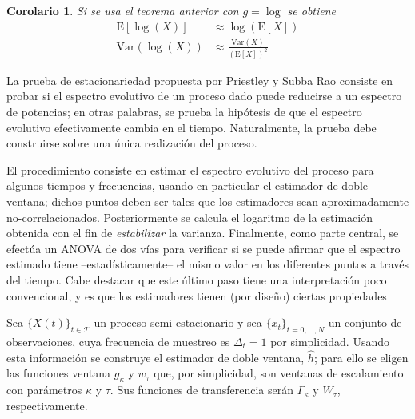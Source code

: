 \documentclass[12pt,letterpaper,draft]{book}
\newtheorem{corolario}[teorema]{Corolario}
\newcommand{\E}[1]{\mathrm{E}\left[ #1 \right]}
\newcommand{\Var}[1]{\mathrm{Var}\left( #1 \right)}
\newcommand{\xt}{$\{X(t)\}_{t\in \mathcal{T}}$ }
\newcommand{\xtd}{$\{x_t\}_{t=0,\dots,N}$ }
\begin{document}
\begin{corolario}
Si se usa el teorema anterior con $g = \log$ se obtiene
\begin{align}
\E{\log(X)} &\approx \log\left( \E{X} \right) \\
\Var{\log(X)} &\approx \frac{\Var{X}}{\left( \E{X} \right)^{2}}
\end{align}
\end{corolario}

La prueba de estacionariedad propuesta por Priestley y Subba Rao \cite{Priestley69} consiste en probar si el espectro evolutivo de un proceso dado puede reducirse a un espectro de potencias; en otras palabras, se prueba la hipótesis de que el espectro evolutivo efectivamente cambia en el tiempo. 
%
Naturalmente, la prueba debe construirse sobre una única realización del proceso.

El procedimiento consiste en estimar el espectro evolutivo del proceso para algunos tiempos y frecuencias, usando en particular el estimador de doble ventana; dichos puntos deben ser tales que los estimadores sean aproximadamente no-correlacionados.
%
Posteriormente se calcula el logaritmo de la estimación obtenida con el fin de \textit{estabilizar} la varianza.
%
Finalmente, como parte central, se efectúa un ANOVA de dos vías para verificar si se puede afirmar que el espectro estimado tiene --estadísticamente-- el mismo valor en los diferentes puntos a través del tiempo.
%
Cabe destacar que este último paso tiene una interpretación poco convencional, y es que los estimadores tienen (por diseño) ciertas propiedades

Sea \xt un proceso semi-estacionario y sea \xtd un conjunto de observaciones, cuya frecuencia de 
muestreo es $\Delta_t=1$ por simplicidad.
%
Usando esta información se construye el estimador de doble ventana, $\widehat{h}$; para ello se eligen las funciones ventana $g_\kappa$ y $w_\tau$ que, por simplicidad, son ventanas de escalamiento con parámetros $\kappa$ y $\tau$. Sus funciones de transferencia serán $\Gamma_\kappa$ y $W_\tau$, respectivamente.
\end{document}
